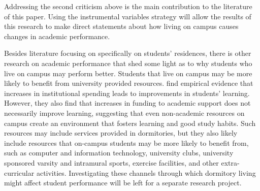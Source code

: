 \documentclass[12pt]{article}
\newcommand{\citee}[1]{\citename{#1} \citeyear{#1}}
\begin{document}
Addressing the second criticism above is the main contribution to the literature of this paper. Using the instrumental variables strategy will allow the results of this research to make direct statements about how living on campus causes changes in academic performance.

Besides literature focusing on specifically on students' residences, there is other research on academic performance that shed some light as to why students who live on campus may perform better. Students that live on campus may be more likely to benefit from university provided resources. \citee{ts2001} find empirical evidence that increases in institutional spending leads to improvements in students' learning. However, they also find that increases in funding to academic support does not necessarily improve learning, suggesting that even non-academic resources on campus create an environment that fosters learning and good study habits. Such resources may include services provided in dormitories, but they also likely include resources that on-campus students may be more likely to benefit from, such as computer and information technology, university clubs, university sponsored varsity and intramural sports, exercise facilities, and other extra-curricular activities. Investigating these channels through which dormitory living might affect student performance will be left for a separate research project.
\end{document}
